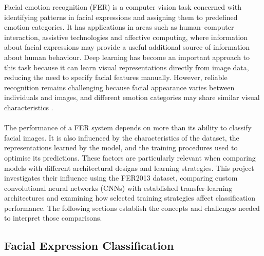 \documentclass[12pt, a4paper]{report}
\let\oldsubsection\subsection
\renewcommand{\subsection}{%
    \Needspace{6\baselineskip}%
    \oldsubsection
}
\begin{document}
			Facial emotion recognition (FER) is a computer vision task concerned with identifying patterns in facial expressions and assigning them to predefined emotion categories. It has applications in areas such as human--computer interaction, assistive technologies and affective computing, where information about facial expressions may provide a useful additional source of information about human behaviour. Deep learning has become an important approach to this task because it can learn visual representations directly from image data, reducing the need to specify facial features manually. However, reliable recognition remains challenging because facial appearance varies between individuals and images, and different emotion categories may share similar visual characteristics \cite{Sutar2023DeepFER, Georgiou2026FERReview}.\\\\
			The performance of a FER system depends on more than its ability to classify facial images. It is also influenced by the characteristics of the dataset, the representations learned by the model, and the training procedures used to optimise its predictions. These factors are particularly relevant when comparing models with different architectural designs and learning strategies. This project investigates their influence using the FER2013 dataset, comparing custom convolutional neural networks (CNNs) with established transfer-learning architectures and examining how selected training strategies affect classification performance. The following sections establish the concepts and challenges needed to interpret those comparisons.
			
			\subsection{Facial Expression Classification}
				
\end{document}
